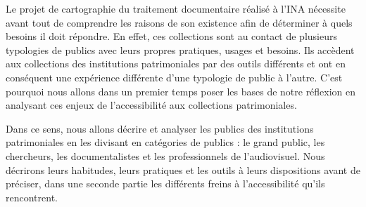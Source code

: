 
Le projet de cartographie du traitement documentaire réalisé à l'INA nécessite avant tout de comprendre les raisons de son existence afin de déterminer à quels besoins il doit répondre. En effet, ces collections sont au contact de plusieurs typologies de publics avec leurs propres pratiques, usages et besoins. Ils accèdent aux collections des institutions patrimoniales par des outils différents et ont en conséquent une expérience différente d'une typologie de public à l'autre. C'est pourquoi nous allons dans un premier temps poser les bases de notre réflexion en analysant ces enjeux de l'accessibilité aux collections patrimoniales. 


Dans ce sens, nous allons décrire et analyser les publics des institutions patrimoniales en les divisant en catégories de publics : le grand public, les chercheurs, les documentalistes et les professionnels de l’audiovisuel. Nous décrirons leurs habitudes, leurs pratiques et les outils à leurs dispositions avant de préciser, dans une seconde partie les différents freins à l'accessibilité qu'ils rencontrent. 